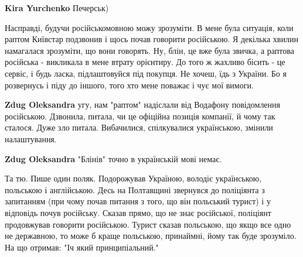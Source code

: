 \begin{itemize}
\begin{itemize}
\textbf{Kira Yurchenko} Печерськ)
\end{itemize}

 

Насправді, будучи російськомовною можу зрозуміти. В мене була ситуація, коли
раптом Київстар подзвонив і щось почав говорити російською. Я декілька хвилин
намагалася зрозуміти, що вони говорять. Ну, блін, це вже була звичка, а раптова
російська - викликала в мене втрату орієнтиру. До того ж жахливо бісить - це
сервіс, і будь ласка, підлаштовуйся під покупця. Не хочеш, їдь з України. Бо я
розвернусь і піду до іншого, того хто мене поважає і чує мої вимоги.

\begin{itemize}
 
\textbf{Zdug Oleksandra} угу, нам "раптом" надіслали від Водафону повідомлення російською. Дзвонила, питала, чи це офіційна позиція компанії, й чому так сталося. Дуже зло питала. Вибачилися, спілкувалися українською, змінили налаштування.

 
\textbf{Zdug Oleksandra} "Блінів" точно в українській мові немає.
\end{itemize}

 

Та тю. Пише один поляк. Подорожував Україною, володіє українською, польською і
англійською. Десь на Полтавщині звернувся до поліціянта з запитанням (при чому
почав питання з того, що він польський турист) і у відповідь почув російську.
Сказав прямо, що не знає російської, поліціянт продовжував говорити російською.
Турист сказав польською, що якщо все одно не державною, то може б краще
польською, принаймні, йому так буде зрозуміло. На що отримав: "Іч який
принципіальний." 🤦🤦🤦


\end{itemize}
